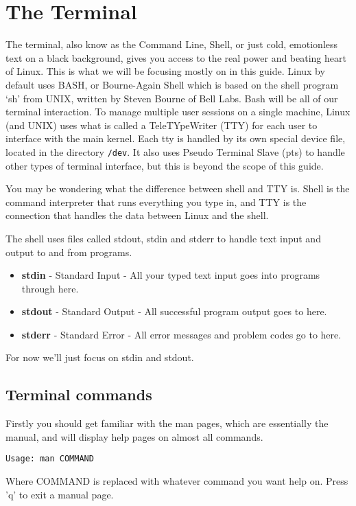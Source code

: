 \documentclass{article}
\begin{document}
\section{The Terminal}
The terminal, also know as the Command Line, Shell, or just cold, emotionless text on a black background, gives you access to the real power and beating heart of Linux. This is what we will be focusing mostly on in this guide. Linux by default uses BASH, or Bourne-Again Shell which is based on the shell program `sh' from UNIX, written by Steven Bourne of Bell Labs. Bash will be all of our terminal interaction. 
To manage multiple user sessions on a single machine, Linux (and UNIX) uses what is called a TeleTYpeWriter (TTY) for each user to interface with the main kernel. Each tty is handled by its own special device file, located in the directory \texttt{/dev}. It also uses Pseudo Terminal Slave (pts) to handle other types of terminal interface, but this is beyond the scope of this guide.

You may be wondering what the difference between shell and TTY is. Shell is the command interpreter that runs everything you type in, and TTY is the connection that handles the data between Linux and the shell.

The shell uses files called stdout, stdin and stderr to handle text input and output to and from programs.

\begin{itemize}
\item \textbf{stdin} - Standard Input - All your typed text input goes into programs through here.
\item \textbf{stdout} - Standard Output - All successful program output goes to here.
\item \textbf{stderr} - Standard Error - All error messages and problem codes go to here. 
\end{itemize}
For now we'll just focus on stdin and stdout.

\subsection{Terminal commands}
Firstly you should get familiar with the man pages, which are essentially the manual, and will display help pages on almost all commands.
\begin{verbatim}
Usage: man COMMAND
\end{verbatim}
Where COMMAND is replaced with whatever command you want help on. Press 'q' to exit a manual page.
\end{document}
